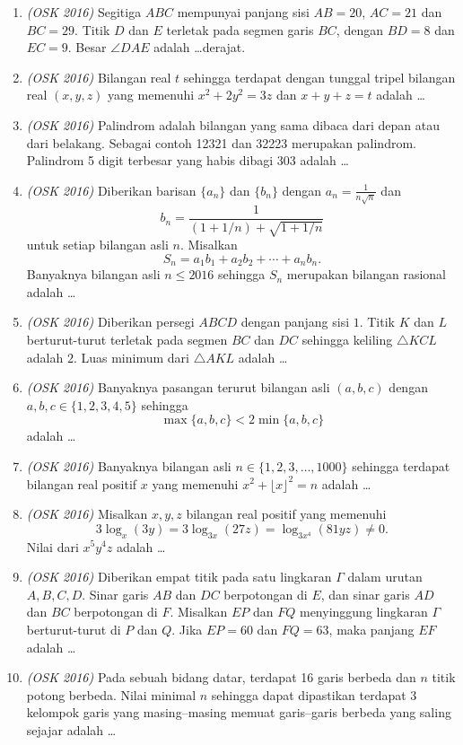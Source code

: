 \documentclass[11pt]{scrartcl}
\begin{document}
\begin{enumerate}
\item \textit{(OSK 2016)} Segitiga $ABC$ mempunyai panjang sisi $AB = 20$, $AC = 21$ dan $BC = 29$. Titik $D$ dan $E$ terletak pada segmen garis $BC$, dengan $BD = 8$ dan $EC = 9$. Besar $\angle DAE$ adalah \dots derajat.

\item \textit{(OSK 2016)} Bilangan real $t$ sehingga terdapat dengan tunggal tripel bilangan real $(x,y,z)$ yang memenuhi $x^2 + 2y^2 = 3z$ dan $x + y + z = t$ adalah \dots

\item \textit{(OSK 2016)}  Palindrom adalah bilangan yang sama dibaca dari depan atau dari belakang. Sebagai contoh 12321 dan 32223 merupakan palindrom. Palindrom 5 digit terbesar yang habis dibagi 303 adalah \dots

\item \textit{(OSK 2016)}  Diberikan barisan $\{a_n\}$ dan $\{b_n\}$ dengan $a_n = \frac{1}{n\sqrt{n}}$ dan 
\[
b_n = \frac{1}{(1 + 1/n) + \sqrt{1 + 1/n}}
\]
untuk setiap bilangan asli $n$. Misalkan 
\[
S_n = a_1 b_1 + a_2 b_2 + \cdots + a_n b_n.
\]
Banyaknya bilangan asli $n \le 2016$ sehingga $S_n$ merupakan bilangan rasional adalah \dots

\item \textit{(OSK 2016)} Diberikan persegi $ABCD$ dengan panjang sisi $1$. Titik $K$ dan $L$ berturut-turut terletak pada segmen $BC$ dan $DC$ sehingga keliling $\triangle KCL$ adalah $2$. Luas minimum dari $\triangle AKL$ adalah \dots

\item \textit{(OSK 2016)} Banyaknya pasangan terurut bilangan asli $(a,b,c)$ dengan $a,b,c \in \{1,2,3,4,5\}$ sehingga
\[
\max\{a,b,c\} < 2\min\{a,b,c\}
\]
adalah \dots

\item \textit{(OSK 2016)} Banyaknya bilangan asli $n \in \{1,2,3,\dots,1000\}$ sehingga terdapat bilangan real positif $x$ yang memenuhi $x^2 + \lfloor x \rfloor^2 = n$ adalah \dots

\item \textit{(OSK 2016)} Misalkan $x,y,z$ bilangan real positif yang memenuhi
\[
3\log_x(3y) = 3\log_{3x}(27z) = \log_{3x^4}(81yz) \ne 0.
\]
Nilai dari $x^5 y^4 z$ adalah \dots

\item \textit{(OSK 2016)} Diberikan empat titik pada satu lingkaran $\Gamma$ dalam urutan $A,B,C,D$. Sinar garis $AB$ dan $DC$ berpotongan di $E$, dan sinar garis $AD$ dan $BC$ berpotongan di $F$. Misalkan $EP$ dan $FQ$ menyinggung lingkaran $\Gamma$ berturut-turut di $P$ dan $Q$. Jika $EP = 60$ dan $FQ = 63$, maka panjang $EF$ adalah \dots

\item \textit{(OSK 2016)} Pada sebuah bidang datar, terdapat 16 garis berbeda dan $n$ titik potong berbeda. Nilai minimal $n$ sehingga dapat dipastikan terdapat 3 kelompok garis yang masing–masing memuat garis–garis berbeda yang saling sejajar adalah \dots

\end{enumerate}
\end{document}
